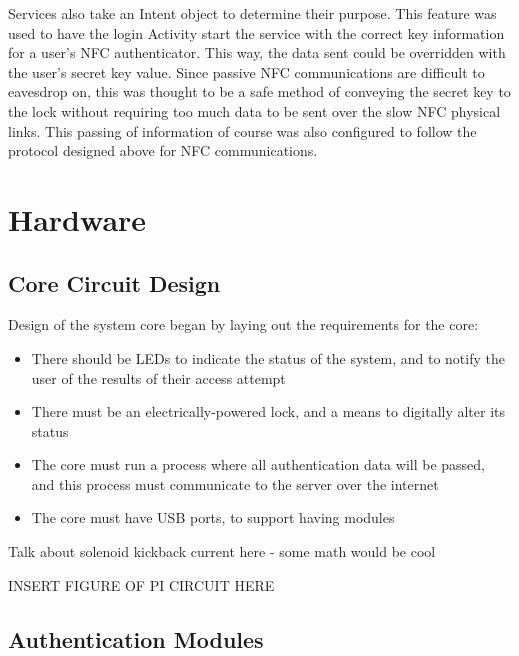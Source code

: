 \documentclass[12pt]{report}
\begin{document}
Services also take an Intent object to determine their purpose. This feature was used to have the login Activity start
the service with the correct key information for a user's NFC authenticator. This way, the data sent could be overridden
with the user's secret key value. Since passive NFC communications are difficult to eavesdrop on, this was thought to be
a safe method of conveying the secret key to the lock without requiring too much data to be sent over the slow NFC
physical links. This passing of information of course was also configured to follow the protocol designed above for NFC
communications.


\section{Hardware}


\subsection{Core Circuit Design}

Design of the system core began by laying out the requirements for the core:
\begin{itemize}
    \item There should be LEDs to indicate the status of the system, and to notify the user of the results of their 
    access attempt
    \item There must be an electrically-powered lock, and a means to digitally alter its status
    \item The core must run a process where all authentication data will be passed, and this process must communicate 
    to the server over the internet
    \item The core must have USB ports, to support having modules 
\end{itemize}

Talk about solenoid kickback current here - some math would be cool

INSERT FIGURE OF PI CIRCUIT HERE


\subsection{Authentication Modules}
\end{document}
